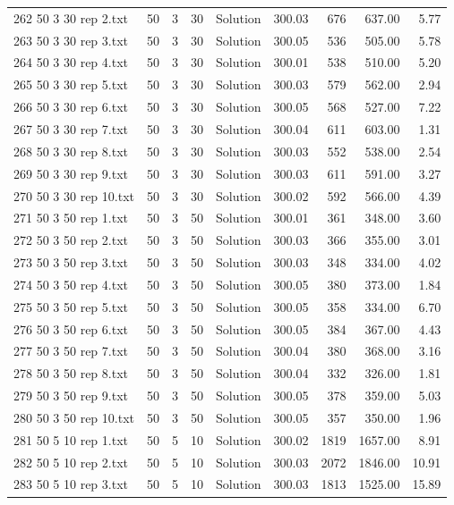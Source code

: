 \begin{longtable}{lrrllrrrr}
262 50 3 30 rep 2.txt & 50 & 3 & 30 & Solution & 300.03 & 676 & 637.00 &  5.77\\
263 50 3 30 rep 3.txt & 50 & 3 & 30 & Solution & 300.05 & 536 & 505.00 &  5.78\\
264 50 3 30 rep 4.txt & 50 & 3 & 30 & Solution & 300.01 & 538 & 510.00 &  5.20\\
265 50 3 30 rep 5.txt & 50 & 3 & 30 & Solution & 300.03 & 579 & 562.00 &  2.94\\
266 50 3 30 rep 6.txt & 50 & 3 & 30 & Solution & 300.05 & 568 & 527.00 &  7.22\\
267 50 3 30 rep 7.txt & 50 & 3 & 30 & Solution & 300.04 & 611 & 603.00 &  1.31\\
268 50 3 30 rep 8.txt & 50 & 3 & 30 & Solution & 300.03 & 552 & 538.00 &  2.54\\
269 50 3 30 rep 9.txt & 50 & 3 & 30 & Solution & 300.03 & 611 & 591.00 &  3.27\\
270 50 3 30 rep 10.txt & 50 & 3 & 30 & Solution & 300.02 & 592 & 566.00 &  4.39\\
271 50 3 50 rep 1.txt & 50 & 3 & 50 & Solution & 300.01 & 361 & 348.00 &  3.60\\
272 50 3 50 rep 2.txt & 50 & 3 & 50 & Solution & 300.03 & 366 & 355.00 &  3.01\\
273 50 3 50 rep 3.txt & 50 & 3 & 50 & Solution & 300.03 & 348 & 334.00 &  4.02\\
274 50 3 50 rep 4.txt & 50 & 3 & 50 & Solution & 300.05 & 380 & 373.00 &  1.84\\
275 50 3 50 rep 5.txt & 50 & 3 & 50 & Solution & 300.05 & 358 & 334.00 &  6.70\\
276 50 3 50 rep 6.txt & 50 & 3 & 50 & Solution & 300.05 & 384 & 367.00 &  4.43\\
277 50 3 50 rep 7.txt & 50 & 3 & 50 & Solution & 300.04 & 380 & 368.00 &  3.16\\
278 50 3 50 rep 8.txt & 50 & 3 & 50 & Solution & 300.04 & 332 & 326.00 &  1.81\\
279 50 3 50 rep 9.txt & 50 & 3 & 50 & Solution & 300.05 & 378 & 359.00 &  5.03\\
280 50 3 50 rep 10.txt & 50 & 3 & 50 & Solution & 300.05 & 357 & 350.00 &  1.96\\
281 50 5 10 rep 1.txt & 50 & 5 & 10 & Solution & 300.02 & 1819 & 1657.00 &  8.91\\
282 50 5 10 rep 2.txt & 50 & 5 & 10 & Solution & 300.03 & 2072 & 1846.00 & 10.91\\
283 50 5 10 rep 3.txt & 50 & 5 & 10 & Solution & 300.03 & 1813 & 1525.00 & 15.89\\

\end{longtable}
